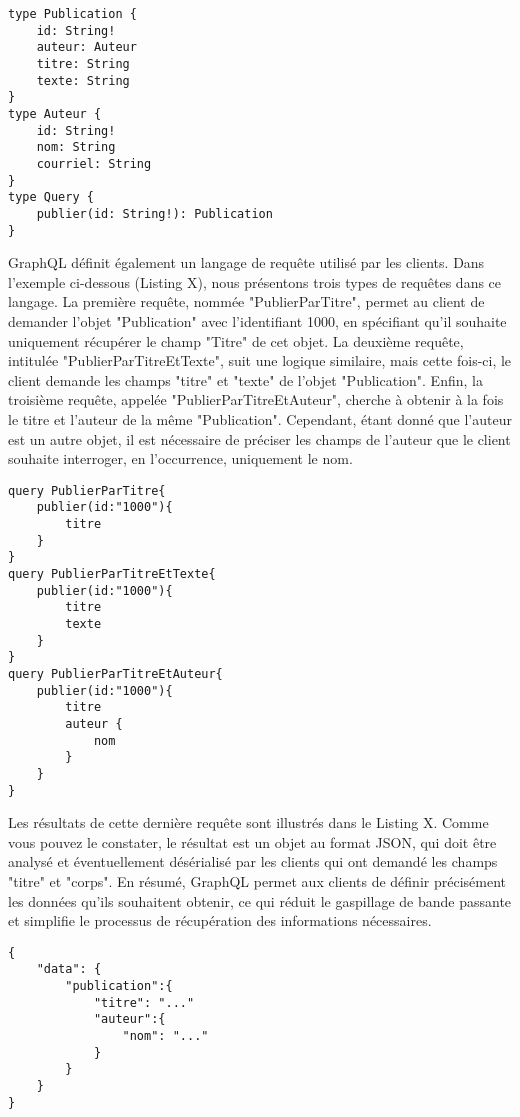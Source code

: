 \begin{lstlisting}
type Publication {
    id: String!
    auteur: Auteur
    titre: String
    texte: String
}
type Auteur {
    id: String!
    nom: String
    courriel: String
}
type Query {
    publier(id: String!): Publication
}
\end{lstlisting}

GraphQL définit également un langage de requête utilisé par les clients. Dans l'exemple ci-dessous (Listing X), nous présentons trois types de requêtes dans ce langage. La première requête, nommée "PublierParTitre", permet au client de demander l'objet "Publication" avec l'identifiant 1000, en spécifiant qu'il souhaite uniquement récupérer le champ "Titre" de cet objet. La deuxième requête, intitulée "PublierParTitreEtTexte", suit une logique similaire, mais cette fois-ci, le client demande les champs "titre" et "texte" de l'objet "Publication". Enfin, la troisième requête, appelée "PublierParTitreEtAuteur", cherche à obtenir à la fois le titre et l'auteur de la même "Publication". Cependant, étant donné que l'auteur est un autre objet, il est nécessaire de préciser les champs de l'auteur que le client souhaite interroger, en l'occurrence, uniquement le nom.

\begin{lstlisting}
query PublierParTitre{
    publier(id:"1000"){
        titre
    }
}
query PublierParTitreEtTexte{
    publier(id:"1000"){
        titre
        texte
    }
}
query PublierParTitreEtAuteur{
    publier(id:"1000"){
        titre
        auteur {
            nom
        }
    }
}
\end{lstlisting}

Les résultats de cette dernière requête sont illustrés dans le Listing X. Comme vous pouvez le constater, le résultat est un objet au format JSON, qui doit être analysé et éventuellement désérialisé par les clients qui ont demandé les champs "titre" et "corps". En résumé, GraphQL permet aux clients de définir précisément les données qu'ils souhaitent obtenir, ce qui réduit le gaspillage de bande passante et simplifie le processus de récupération des informations nécessaires.

\break
\begin{lstlisting}
{ 
    "data": {
        "publication":{
            "titre": "..."
            "auteur":{
                "nom": "..."
            }
        }
    }
}
\end{lstlisting}

